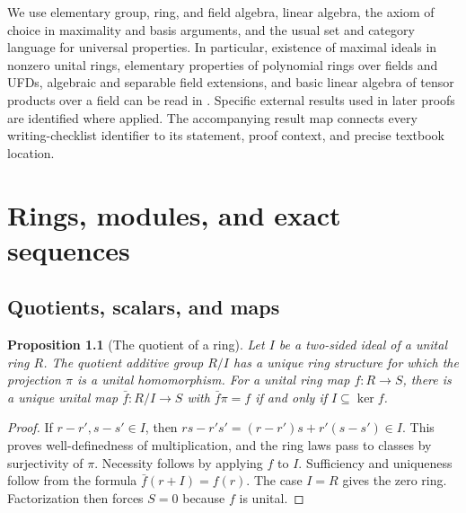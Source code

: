 \documentclass[11pt,oneside,openany]{book}
\newtheorem{proposition}[theorem]{Proposition}
\theoremstyle{definition}
\theoremstyle{remark}
\begin{document}
We use elementary group, ring, and field algebra, linear algebra, the axiom of choice in maximality and basis arguments, and the usual set and category language for universal properties. In particular, existence of maximal ideals in nonzero unital rings, elementary properties of polynomial rings over fields and UFDs, algebraic and separable field extensions, and basic linear algebra of tensor products over a field can be read in \cite{dummit,d07,d05}. Specific external results used in later proofs are identified where applied. The accompanying result map connects every writing-checklist identifier to its statement, proof context, and precise textbook location.

{\small\tableofcontents}
\mainmatter
\chapter[Rings, modules, and exact sequences]{Rings, modules, and exact sequences}
\label{p103:ch01}

\section{Quotients, scalars, and maps}

\begin{proposition}[The quotient of a ring]\label{p103:ALG-03-C01-R01}
Let \(I\) be a two-sided ideal of a unital ring \(R\). The quotient
additive group \(R/I\) has a unique ring structure for which the
projection \(\pi\) is a unital homomorphism. For a unital ring map
\(f:R\to S\), there is a unique unital map \(\bar f:R/I\to S\) with
\(\bar f\pi=f\) if and only if \(I\subseteq\ker f\).
\end{proposition}
\begin{proof}
If \(r-r',s-s'\in I\), then
\(rs-r's'=(r-r')s+r'(s-s')\in I\). This proves well-definedness of
multiplication, and the ring laws pass to classes by surjectivity of
\(\pi\). Necessity follows by applying \(f\) to \(I\). Sufficiency and
uniqueness follow from the formula \(\bar f(r+I)=f(r)\).
The case \(I=R\) gives the zero ring. Factorization then forces
\(S=0\) because \(f\) is unital.
\end{proof}
\end{document}
